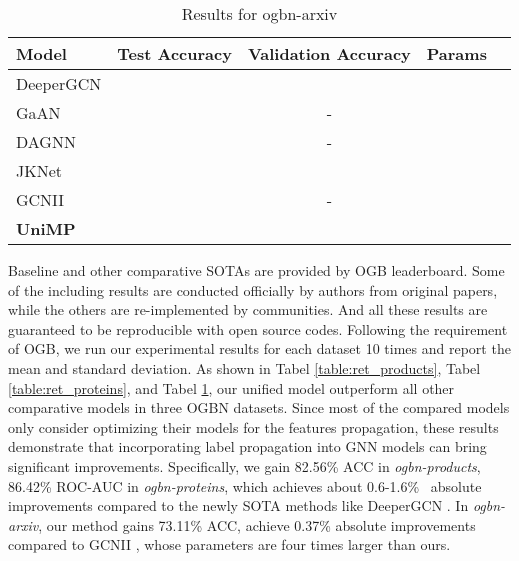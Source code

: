 \documentclass{article} \usepackage{iclr2021_conference,times}
\begin{document}
\begin{table}[htbp]
	\setlength{\abovecaptionskip}{0.cm}
	\setlength{\belowcaptionskip}{-.2cm}
	\caption{Results for ogbn-arxiv}
	\small
	\begin{center}
		\begin{tabular}{l|cccc}
			{\bf Model}  & {\bf Test Accuracy	} &  {\bf Validation Accuracy	}  &  {\bf Params} \\
			\hline 
			DeeperGCN \citep{li2020deepergcn} & && \\ 
			GaAN \citep{zhang2018gaan} & & - & \\ 
			DAGNN \citep{liu2020towards} &  & -  &\\
			JKNet \citep{xu2018representation} &  & & \\
			GCNII \citep{chen2020simple}  &  & - &   \\
\hline 
			{\bf UniMP} & & &\\
		\end{tabular}
	\end{center}
	\label{table:ret_arxiv}
	\vspace{-4mm}
\end{table}


Baseline and other comparative SOTAs are provided by OGB leaderboard. Some of the including results are conducted officially by authors from original papers, while the others are re-implemented by communities. And all these results are guaranteed to be reproducible with open source codes. Following the requirement of OGB, we run our experimental results for each dataset 10 times and report the mean and standard deviation. As shown in Tabel \ref{table:ret_products}, Tabel \ref{table:ret_proteins}, and Tabel \ref{table:ret_arxiv}, our unified model outperform all other comparative models in three OGBN datasets.
Since most of the compared models only consider optimizing their models for the features propagation, these results demonstrate that incorporating label propagation into GNN models can bring significant improvements.
Specifically, we gain 82.56\% ACC in \emph{ogbn-products}, 86.42\% ROC-AUC in \emph{ogbn-proteins}, which achieves about 0.6-1.6\%  absolute improvements compared to the newly SOTA methods like DeeperGCN \citep{li2020deepergcn}. In \emph{ogbn-arxiv}, our method gains 73.11\% ACC, achieve 0.37\% absolute improvements compared to GCNII \citep{chen2020simple}, whose parameters are four times larger than ours. 
\end{document}

